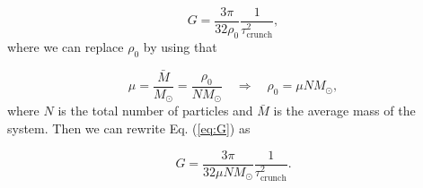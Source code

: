 \documentclass{article}
\begin{document}
\begin{multicols}{2}
\begin{equation}\label{eq:G}
	G = \frac{3\pi}{32 \rho_0} \frac{1}{\tau_{\mathrm{crunch}}^2},
\end{equation}
where we can replace $\rho_0$ by using that

\begin{equation}
	\mu = \frac{\bar{M}}{M_{\odot}} = \frac{\rho_0}{N M_{\odot}} \quad \Rightarrow \quad \rho_0 = \mu N M_{\odot},
\end{equation}
where $N$ is the total number of particles and $\bar{M}$ is the average mass of the system. Then we can rewrite Eq. (\ref{eq:G}) as 

\begin{equation}
	G = \frac{3\pi}{32 \mu N M_{\odot}} \frac{1}{\tau_{\mathrm{crunch}}^2}.
\end{equation}


\end{multicols}
\end{document}
